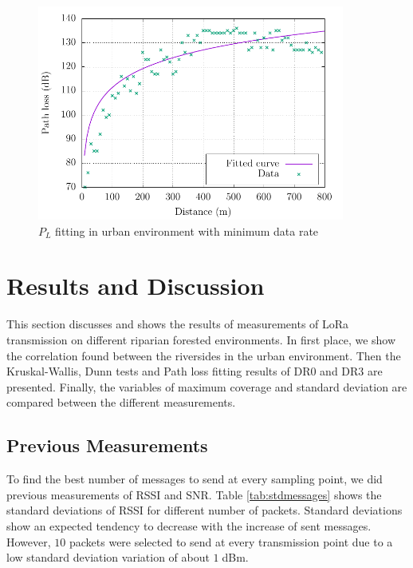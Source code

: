 \begin{figure}[h!]
  \centering
  \includegraphics[width=0.9\textwidth]{Figure5}
  \caption{$P_L$ fitting in urban environment with minimum data rate}
  \label{fig:plfittiing}
\end{figure}

\section{Results and Discussion}

This section discusses and shows the results of measurements of LoRa transmission on different riparian forested environments. In first place, we show the correlation found between the riversides in the urban environment. Then the Kruskal-Wallis, Dunn tests and Path loss fitting results of DR$0$ and DR$3$ are presented. Finally, the variables of maximum coverage and standard deviation are compared between the different measurements.  

\subsection{Previous Measurements}

To find the best number of messages to send at every sampling point, we did previous measurements of RSSI and SNR. Table \ref{tab:stdmessages} shows the standard deviations of RSSI for different number of packets. Standard deviations show an expected tendency to decrease with the increase of sent messages. However, $10$ packets were selected to send at every transmission point due to a low standard deviation variation of about $1\;$dBm. 

